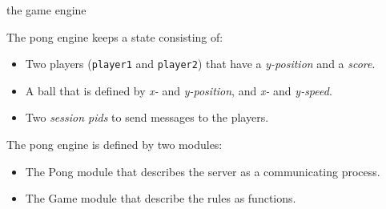 \begin{frame}{the game engine}

  The pong engine keeps a state consisting of:

  \vspace{10pt} \pause
  
  \begin{itemize}
  \item Two players ({\tt player1} and {\tt player2}) that have a {\em y-position} and a {\em score}. \pause
  \item A ball that is defined by {\em x-} and {\em y-position}, and {\em x-} and {\em y-speed}.\pause
  \item Two {\em session pids} to send messages to the players. 
  \end{itemize}

  \vspace{10pt} \pause

  The pong engine is defined by two modules: 
  
  \vspace{10pt} \pause
  \begin{itemize}
  \item The Pong module that describes the server as a communicating process. 
  \item The Game module that describe the rules as functions. 
  \end{itemize}
  

\end{frame}


